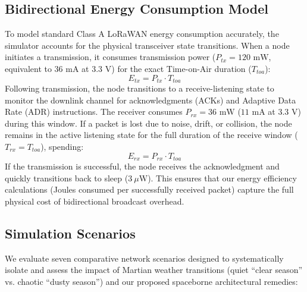 \documentclass{ijuc}
\begin{document}
\subsection{Bidirectional Energy Consumption Model}
To model standard Class A LoRaWAN energy consumption accurately, the simulator accounts for the physical transceiver state transitions. When a node initiates a transmission, it consumes transmission power ($P_{tx} = 120\text{ mW}$, equivalent to $36\text{ mA}$ at $3.3\text{ V}$) for the exact Time-on-Air duration ($T_{toa}$):
\begin{equation}
    E_{tx} = P_{tx} \cdot T_{toa}
\end{equation}
Following transmission, the node transitions to a receive-listening state to monitor the downlink channel for acknowledgments (ACKs) and Adaptive Data Rate (ADR) instructions. The receiver consumes $P_{rx} = 36\text{ mW}$ ($11\text{ mA}$ at $3.3\text{ V}$) during this window. If a packet is lost due to noise, drift, or collision, the node remains in the active listening state for the full duration of the receive window ($T_{rx} = T_{toa}$), spending:
\begin{equation}
    E_{rx} = P_{rx} \cdot T_{toa}
\end{equation}
If the transmission is successful, the node receives the acknowledgment and quickly transitions back to sleep ($3\ \mu\text{W}$). This ensures that our energy efficiency calculations (Joules consumed per successfully received packet) capture the full physical cost of bidirectional broadcast overhead.

\subsection{Simulation Scenarios}
We evaluate seven comparative network scenarios designed to systematically isolate and assess the impact of Martian weather transitions (quiet ``clear season'' vs. chaotic ``dusty season'') and our proposed spaceborne architectural remedies:
\end{document}
